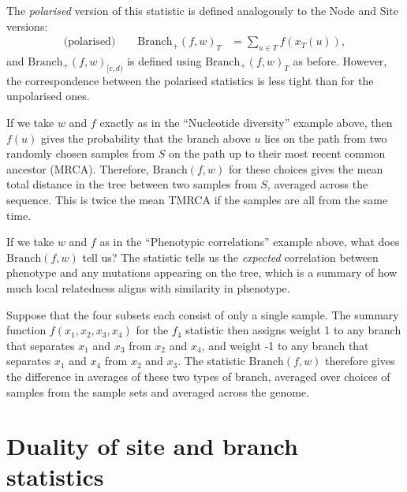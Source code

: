 \documentclass{article}
\newcommand{\branch}{\mbox{Branch}} %
\newcommand{\branchp}{\mbox{Branch}_+} %
\newcommand{\iw}{w} %
\newcommand{\nw}{x} %
\begin{document}
The \emph{polarised} version of this statistic
is defined analogously to the Node and Site versions:
\begin{align} \label{eqn:branch_polarised}
    \text{(polarised)} \qquad
    \branchp(f, \iw)_T
    &=
    \sum_{u \in T} f(\nw_{T}(u)) ,
\end{align}
and $\branchp(f, \iw)_{[c,d)}$ is defined using $\branchp(f, \iw)_T$ as before.
However, the correspondence between the polarised statistics is less tight
than for the unpolarised ones.


\begin{example} \label{ex:branch_diversity}
    If we take $\iw$ and $f$ exactly as in the ``Nucleotide diversity'' example above,
    then $f(u)$ gives the probability that the branch above $u$
    lies on the path from two randomly chosen samples from $S$
    on the path up to their most recent common ancestor (MRCA).
    Therefore, $\branch(f, \iw)$ for these choices
    gives the mean total distance in the tree between two samples from $S$,
    averaged across the sequence.
    This is twice the mean TMRCA if the samples are all from the same time.
\end{example}

\begin{example} \label{ex:branch_correlation}
    If we take $\iw$ and $f$ as in the ``Phenotypic correlations'' example above,
    what does $\branch(f, \iw)$ tell us?
    The statistic tells us the \emph{expected} correlation between phenotype and any mutations
    appearing on the tree, which is a summary of how much local relatedness
    aligns with similarity in phenotype.
\end{example}


\begin{example}[Patterson's $f_4$] \label{ex:branch_f4}
    Suppose that the four subsets each consist of only a single sample.
    The summary function $f(x_1, x_2, x_3, x_4)$ for the $f_4$ statistic
    then assigns weight 1 to any branch that separates $x_1$ and $x_3$ from $x_2$ and $x_4$,
    and weight -1 to any branch that separates $x_1$ and $x_4$ from $x_2$ and $x_3$.
    The statistic $\branch(f, \iw)$ therefore
    gives the difference in averages of these two types of branch,
    averaged over choices of samples from the sample sets and averaged across the genome.
\end{example}

\section*{Duality of site and branch statistics}
\end{document}
